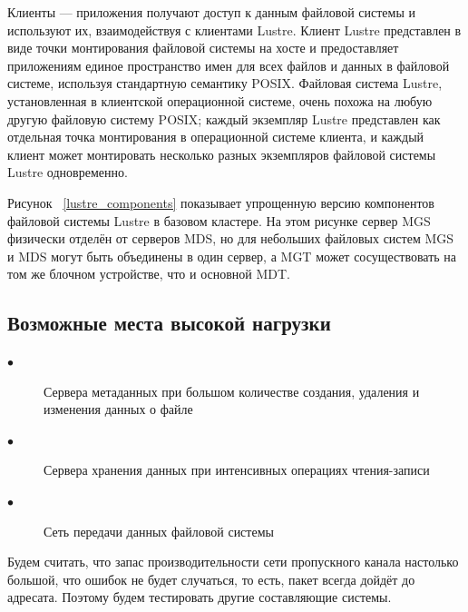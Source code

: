 Клиенты --- приложения получают доступ к данным файловой системы и используют их, взаимодействуя с клиентами Lustre.
Клиент Lustre представлен в виде точки монтирования файловой системы на хосте и предоставляет приложениям единое
пространство имен для всех файлов и данных в файловой системе, используя стандартную семантику POSIX. Файловая
система Lustre, установленная в клиентской операционной системе, очень похожа на любую другую файловую систему
POSIX; каждый экземпляр Lustre представлен как отдельная точка монтирования в операционной системе клиента, и
каждый клиент может монтировать несколько разных экземпляров файловой системы Lustre одновременно.

Рисунок ~\ref{lustre_components} показывает упрощенную версию компонентов файловой системы Lustre в базовом кластере. На этом рисунке сервер MGS физически отделён от серверов MDS, но для небольших файловых систем MGS и MDS могут быть объединены в один сервер, а MGT может сосуществовать на том же блочном устройстве, что и основной MDT.

\subsection{Возможные места высокой нагрузки}

\begin{description}
    \item[$\bullet$] Сервера метаданных при большом количестве создания, удаления и изменения данных о файле
    \item[$\bullet$] Сервера хранения данных при интенсивных операциях чтения-записи
    \item[$\bullet$] Сеть передачи данных файловой системы
\end{description}

Будем считать, что запас производительности сети пропускного канала настолько большой, что ошибок не будет
случаться, то есть, пакет всегда дойдёт до адресата. Поэтому будем тестировать другие составляющие системы.
